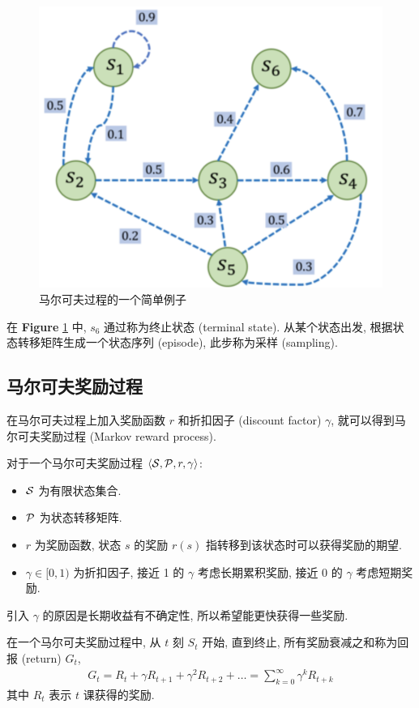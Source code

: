 \begin{figure}[!htb]
    \centering
    \includegraphics[width=0.618\linewidth]{pic/RL3/马尔可夫过程的一个简单例子.png}
    \caption{ \label{fig:rl3-markov} 马尔可夫过程的一个简单例子}
\end{figure}

在 \textbf{Figure} \ref{fig:rl3-markov} 中, $s_6$ 通过称为终止状态 (terminal state). 从某个状态出发, 根据状态转移矩阵生成一个状态序列 (episode), 此步称为采样 (sampling). 

\subsection{马尔可夫奖励过程}
在马尔可夫过程上加入奖励函数 $r$ 和折扣因子 (discount factor) $\gamma$, 就可以得到马尔可夫奖励过程 (Markov reward process).

\begin{definition}[马尔可夫奖励过程]
    对于一个马尔可夫奖励过程 $\braket{\mathcal{S}, \mathcal{P}, r, \gamma}$:
    \begin{itemize}
        \item $\mathcal{S}$ 为有限状态集合.
        \item $\mathcal{P}$ 为状态转移矩阵.
        \item $r$ 为奖励函数, 状态 $s$ 的奖励 $r(s)$ 指转移到该状态时可以获得奖励的期望. 
        \item $\gamma\in[0,1)$ 为折扣因子, 接近 1 的 $\gamma$ 考虑长期累积奖励, 接近 0 的 $\gamma$ 考虑短期奖励. 
    \end{itemize}
\end{definition}
引入 $\gamma$ 的原因是长期收益有不确定性, 所以希望能更快获得一些奖励. 

\begin{definition}[回报]
    在一个马尔可夫奖励过程中, 从 $t$ 刻 $S_t$ 开始, 直到终止, 所有奖励衰减之和称为回报 (return) $G_t$, 
    \begin{align*}
        G_t=R_t + \gamma R_{t+1} + \gamma^2R_{t+2} + \dots = \sum_{k=0}^\infty \gamma^k R_{t+k}
    \end{align*}
    其中 $R_t$ 表示 $t$ 课获得的奖励. 
\end{definition}

